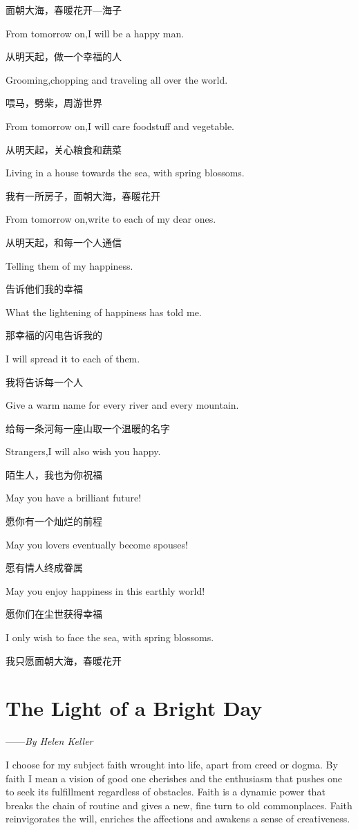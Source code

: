 \documentclass[11pt,twoside,openany,x11names,svgnames]{memoir}
\newcommand\chapterillustration{}
\begin{document}
面朝大海，春暖花开—海子

From tomorrow on,I will be a happy man.

从明天起，做一个幸福的人

Grooming,chopping and traveling all over the world.

喂马，劈柴，周游世界

From tomorrow on,I will care foodstuff and vegetable.

从明天起，关心粮食和蔬菜

Living in a house towards the sea, with spring blossoms.

我有一所房子，面朝大海，春暖花开

From tomorrow on,write to each of my dear ones.

从明天起，和每一个人通信

Telling them of my happiness.

告诉他们我的幸福

What the lightening of happiness has told me.

那幸福的闪电告诉我的

I will spread it to each of them.

我将告诉每一个人

Give a warm name for every river and every mountain.

给每一条河每一座山取一个温暖的名字

Strangers,I will also wish you happy.

陌生人，我也为你祝福

May you have a brilliant future!

愿你有一个灿烂的前程

May you lovers eventually become spouses!

愿有情人终成眷属

May you enjoy happiness in this earthly world!

愿你们在尘世获得幸福

I only wish to face the sea, with spring blossoms.

我只愿面朝大海，春暖花开
\renewcommand\chapterillustration{railroad}
\chapter{The Light of a Bright Day}
\begin{flushright}
——\textit{By Helen Keller}
\end{flushright}
I choose for my subject faith wrought into life, apart from creed or dogma. By faith I mean a vision of good one cherishes and the enthusiasm that pushes one to seek its fulfillment regardless of obstacles. Faith is a dynamic power that breaks the chain of routine and gives a new, fine turn to old commonplaces. Faith reinvigorates the will, enriches the affections and awakens a sense of creativeness.
\end{document}

